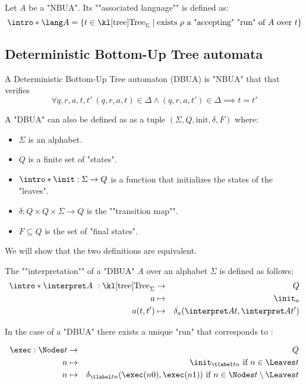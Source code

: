 \documentclass{article}
\begin{document}
\begin{definition}
	Let $A$ be a "NBUA". Its ""associated language"" is defined as:
	\[\intro* \lang A = \setdef {t \in \tree_{\Sigma}} {\text{exists $\rho$ a "accepting" "run" of $A$ over $t$}} \]
\end{definition}

\subsection{Deterministic Bottom-Up Tree automata}

\begin{definition}
	A Deterministic Bottom-Up Tree automaton (DBUA) is "NBUA" that that verifies
	\[ \forall q,r,a,t,t' \ (q,r,a,t) \in \Delta \land   (q,r,a,t') \in \Delta  \implies t = t' \]
\end{definition}



\begin{remark}
	A "DBUA" can also be defined as as a tuple $(\Sigma, Q, \text{init}, \delta, F)$ where:
	\begin{itemize}
		\item $\Sigma$ is an alphabet.
		\item $Q$ is a finite set of "states".
		\item $\intro *\init : \Sigma \to Q$ is a function that initializes the states of the "leaves".
		\item $\delta : Q \times Q \times \Sigma \to Q$ is the ""transition map"".
		\item $F \subseteq Q$ is the set of "final states".
	\end{itemize}
	We will show that the two definitions are equivalent.
\end{remark}

\begin{definition}
	The ""interpretation"" of a "DBUA" $A$  over an alphabet $\Sigma$ is defined as follows:
	\begin{eqnarray*}
		\intro* \interpret A ~: \tree_{\Sigma} &\to& Q \\
		a &\mapsto& \init_a \\
		a(t,t') &\mapsto& \delta_a (\interpret A t, \interpret A {t'})
	\end{eqnarray*}
\end{definition}

\begin{remark}
	In the case of a "DBUA" there exists a unique "run" that corresponds to :

	\begin{eqnarray*}
		\exec : \Nodes t &\to & Q \\
		n  &\mapsto& \init_{\tlabel t n} \text{ if } n \in \Leaves t \\
		n  &\mapsto& \delta_{\tlabel t n}(\exec (n0), \exec (n1)) \text{ if } n \in \Nodes t \setminus \Leaves t
	\end{eqnarray*}
\end{remark}
\end{document}
